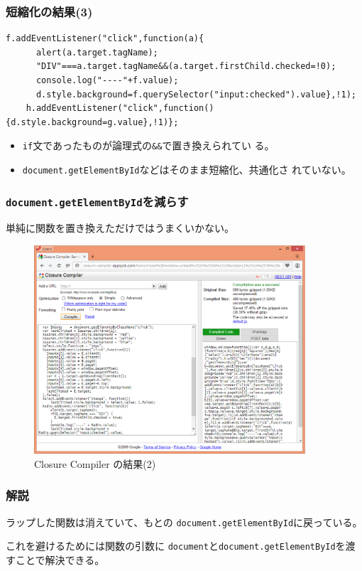 \begin{frame}[containsverbatim]
 \frametitle{短縮化の結果(3)}
\begin{Verbatim}[fontsize=\footnotesize]
    f.addEventListener("click",function(a){
      alert(a.target.tagName);
      "DIV"===a.target.tagName&&(a.target.firstChild.checked=!0);
      console.log("----"+f.value);
      d.style.background=f.querySelector("input:checked").value},!1);
    h.addEventListener("click",function(){d.style.background=g.value},!1)};
\end{Verbatim}
 \begin{itemize}
	\item  \texttt{if}文であったものが論理式の\Verb+&&+で置き換えられてい
				 る。
	\item \texttt{document.getElementById}などはそのまま短縮化、共通化さ
れていない。
 \end{itemize}

\end{frame}
\begin{frame}[containsverbatim]
 \frametitle{\texttt{document.getElementById}を減らす}
 単純に関数を置き換えただけではうまくいかない。
  \begin{figure}[ht]
	\begin{center}
	 \includegraphics[width=0.9\textwidth]{../10-01closur-compiler-res03.eps}
	\end{center}
 \caption{Closure Compiler の結果(2)}\label{closure-compiler-res02}
 \end{figure}
\end{frame}
\begin{frame}[containsverbatim]
 \frametitle{解説}
ラップした関数は消えていて、もとの
 \texttt{document.getElementById}に戻っている。

 これを避けるためには関数の引数に
  \texttt{document}と\texttt{document.getElementById}を渡すことで解決できる。
\end{frame}
